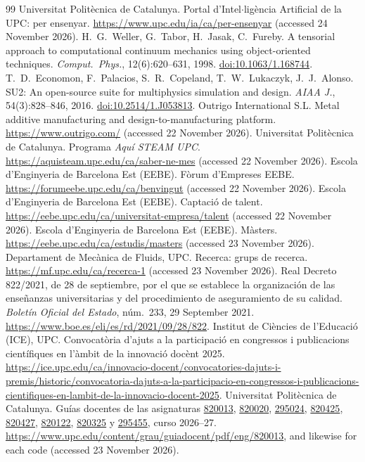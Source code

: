 \documentclass[11pt]{article}
\begin{document}
\begin{thebibliography}{99}
 Universitat Polit\`ecnica de Catalunya. Portal d'Intel$\cdot$lig\`encia Artificial de la UPC: per ensenyar. \url{https://www.upc.edu/ia/ca/per-ensenyar} (accessed 24 November 2026).
 H.\ G.\ Weller, G.\ Tabor, H.\ Jasak, C.\ Fureby. A tensorial approach to computational continuum mechanics using object-oriented techniques. \emph{Comput.\ Phys.}, 12(6):620--631, 1998. \href{https://doi.org/10.1063/1.168744}{doi:10.1063/1.168744}.
 T.\ D.\ Economon, F.\ Palacios, S.\ R.\ Copeland, T.\ W.\ Lukaczyk, J.\ J.\ Alonso. SU2: An open-source suite for multiphysics simulation and design. \emph{AIAA J.}, 54(3):828--846, 2016. \href{https://doi.org/10.2514/1.J053813}{doi:10.2514/1.J053813}.
 Outrigo International S.L. Metal additive manufacturing and design-to-manufacturing platform. \url{https://www.outrigo.com/} (accessed 22 November 2026).
 Universitat Polit\`ecnica de Catalunya. Programa \emph{Aqu\'i STEAM UPC}. \url{https://aquisteam.upc.edu/ca/saber-ne-mes} (accessed 22 November 2026).
 Escola d'Enginyeria de Barcelona Est (EEBE). F\`orum d'Empreses EEBE. \url{https://forumeebe.upc.edu/ca/benvingut} (accessed 22 November 2026).
 Escola d'Enginyeria de Barcelona Est (EEBE). Captaci\'o de talent. \url{https://eebe.upc.edu/ca/universitat-empresa/talent} (accessed 22 November 2026).
 Escola d'Enginyeria de Barcelona Est (EEBE). M\`asters. \url{https://eebe.upc.edu/ca/estudis/masters} (accessed 23 November 2026).
 Departament de Mec\`anica de Fluids, UPC. Recerca: grups de recerca. \url{https://mf.upc.edu/ca/recerca-1} (accessed 23 November 2026).
 Real Decreto 822/2021, de 28 de septiembre, por el que se establece la organizaci\'on de las ense\~nanzas universitarias y del procedimiento de aseguramiento de su calidad. \emph{Bolet\'in Oficial del Estado}, n\'um.~233, 29 September 2021. \url{https://www.boe.es/eli/es/rd/2021/09/28/822}.
 Institut de Ci\`encies de l'Educaci\'o (ICE), UPC. Convocat\`oria d'ajuts a la participaci\'o en congressos i publicacions cient\'ifiques en l'\`ambit de la innovaci\'o doc\`ent 2025. {\def\UrlBreaks{\do\/\do\-}\url{https://ice.upc.edu/ca/innovacio-docent/convocatories-dajuts-i-premis/historic/convocatoria-dajuts-a-la-participacio-en-congressos-i-publicacions-cientifiques-en-lambit-de-la-innovacio-docent-2025}}.
 Universitat Polit\`ecnica de Catalunya. Gu\'ias docentes de las asignaturas \href{https://www.upc.edu/content/grau/guiadocent/pdf/eng/820013}{820013}, \href{https://www.upc.edu/content/grau/guiadocent/pdf/eng/820020}{820020}, \href{https://www.upc.edu/content/grau/guiadocent/pdf/eng/295024}{295024}, \href{https://www.upc.edu/content/grau/guiadocent/pdf/eng/820425}{820425}, \href{https://www.upc.edu/content/grau/guiadocent/pdf/eng/820427}{820427}, \href{https://www.upc.edu/content/grau/guiadocent/pdf/eng/820122}{820122}, \href{https://www.upc.edu/content/grau/guiadocent/pdf/eng/820325}{820325} y \href{https://www.upc.edu/content/grau/guiadocent/pdf/eng/295455}{295455}, curso 2026--27. \url{https://www.upc.edu/content/grau/guiadocent/pdf/eng/820013}, and likewise for each code (accessed 23 November 2026).

\end{thebibliography}
\end{document}
